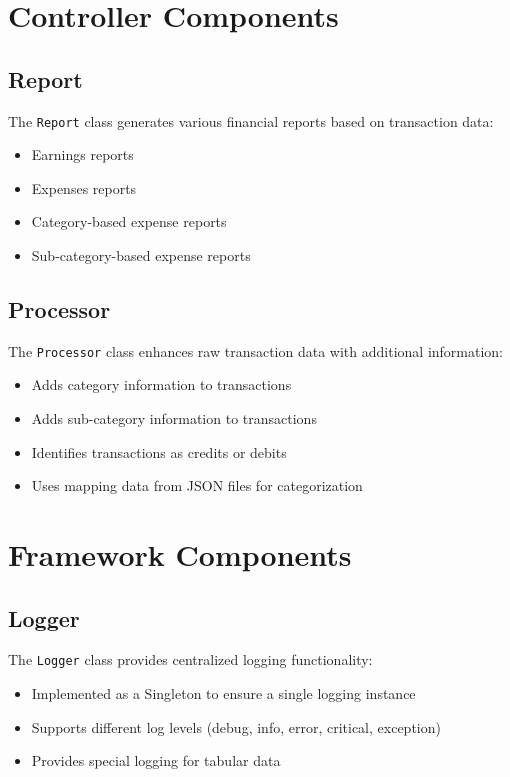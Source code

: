 \documentclass[11pt,a4paper]{report}
\begin{document}
\section{Controller Components}

\subsection{Report}
The \texttt{Report} class generates various financial reports based on transaction data:
\begin{itemize}
    \item Earnings reports
    \item Expenses reports
    \item Category-based expense reports
    \item Sub-category-based expense reports
\end{itemize}

\subsection{Processor}
The \texttt{Processor} class enhances raw transaction data with additional information:
\begin{itemize}
    \item Adds category information to transactions
    \item Adds sub-category information to transactions
    \item Identifies transactions as credits or debits
    \item Uses mapping data from JSON files for categorization
\end{itemize}

\section{Framework Components}

\subsection{Logger}
The \texttt{Logger} class provides centralized logging functionality:
\begin{itemize}
    \item Implemented as a Singleton to ensure a single logging instance
    \item Supports different log levels (debug, info, error, critical, exception)
    \item Provides special logging for tabular data
\end{itemize}
\end{document}
